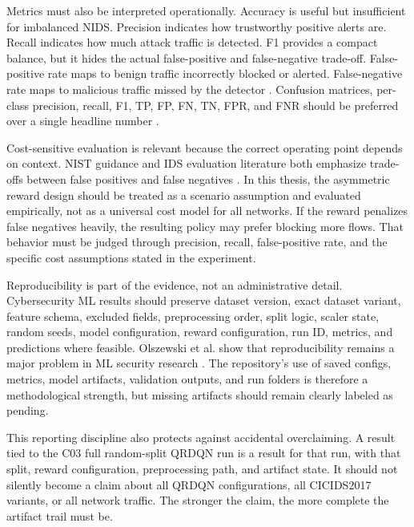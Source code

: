 Metrics must also be interpreted operationally. Accuracy is useful but insufficient for imbalanced NIDS. Precision indicates how trustworthy positive alerts are. Recall indicates how much attack traffic is detected. F1 provides a compact balance, but it hides the actual false-positive and false-negative trade-off. False-positive rate maps to benign traffic incorrectly blocked or alerted. False-negative rate maps to malicious traffic missed by the detector \parencite{Axelsson1999BaseRate,Fawcett2006ROC,Saito2015PRROC}. Confusion matrices, per-class precision, recall, F1, TP, FP, FN, TN, FPR, and FNR should be preferred over a single headline number \parencite{Milenkoski2015IDSEvaluationSurvey}.

Cost-sensitive evaluation is relevant because the correct operating point depends on context. NIST guidance and IDS evaluation literature both emphasize trade-offs between false positives and false negatives \parencite{ScarfoneMell2007,Cardenas2006IDSFramework}. In this thesis, the asymmetric reward design should be treated as a scenario assumption and evaluated empirically, not as a universal cost model for all networks. If the reward penalizes false negatives heavily, the resulting policy may prefer blocking more flows. That behavior must be judged through precision, recall, false-positive rate, and the specific cost assumptions stated in the experiment.

Reproducibility is part of the evidence, not an administrative detail. Cybersecurity ML results should preserve dataset version, exact dataset variant, feature schema, excluded fields, preprocessing order, split logic, scaler state, random seeds, model configuration, reward configuration, run ID, metrics, and predictions where feasible. Olszewski et al. show that reproducibility remains a major problem in ML security research \parencite{Olszewski2023ReproSecurityML}. The repository's use of saved configs, metrics, model artifacts, validation outputs, and run folders is therefore a methodological strength, but missing artifacts should remain clearly labeled as pending.

This reporting discipline also protects against accidental overclaiming. A result tied to the C03 full random-split QRDQN run is a result for that run, with that split, reward configuration, preprocessing path, and artifact state. It should not silently become a claim about all QRDQN configurations, all CICIDS2017 variants, or all network traffic. The stronger the claim, the more complete the artifact trail must be.

